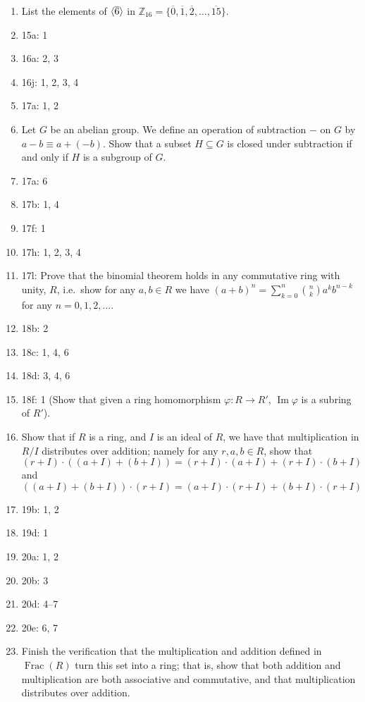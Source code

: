 \documentclass[12pt,letterpaper,DIV=11,final]{scrartcl}
\theoremstyle{plain}
\theoremstyle{definition}
\theoremstyle{remark}
\DeclareMathOperator{\ima}{Im}
\DeclareMathOperator{\Frac}{Frac}
\begin{document}
\begin{enumerate}
  \item List the elements of $\braket{\overline{6}}$ in $\mathbb{Z}_{16} = \{ \overline{0}, \overline{1}, \overline{2}, \dots, \overline{15} \}$.
  \item 15a: 1
  \item 16a: 2, 3
  \item 16j: 1, 2, 3, 4
  \item 17a: 1, 2

  \item Let $G$ be an abelian group.
    We define an operation of subtraction $-$ on $G$ by $a - b \equiv a + (-b)$.
    Show that a subset $H \subseteq G$ is closed under subtraction if and only if $H$ is a subgroup of $G$.
  \item 17a: 6
  \item 17b: 1, 4
  \item 17f: 1
  \item 17h: 1, 2, 3, 4

  \item 17l: Prove that the binomial theorem holds in any commutative ring with unity, $R$,
    i.e.\ show for any $a, b \in R$ we have ${(a + b)}^n = \sum_{k = 0}^n \binom{n}{k} a^k b^{n - k}$ for any $n = 0, 1, 2, \dots$.
  \item 18b: 2
  \item 18c: 1, 4, 6
  \item 18d: 3, 4, 6
  \item 18f: 1 (Show that given a ring homomorphism $\varphi : R \to R'$, $\ima{\varphi}$ is a subring of $R'$).
  \item Show that if $R$ is a ring, and $I$ is an ideal of $R$, we have that multiplication in $R/I$ distributes over addition; namely for any $r, a, b \in R$, show that
    \begin{displaymath}
      (r + I) \cdot \left( (a + I) + (b + I) \right) = (r + I) \cdot (a + I) + (r + I) \cdot (b + I)
    \end{displaymath}
    and
    \begin{displaymath}
      \left( (a + I) + (b + I) \right) \cdot (r + I) = (a + I) \cdot (r + I) + (b + I) \cdot (r + I)
    \end{displaymath}
  \item 19b: 1, 2

  \item 19d: 1
  \item 20a: 1, 2
  \item 20b: 3
  \item 20d: 4--7
  \item 20e: 6, 7
  \item Finish the verification that the multiplication and addition defined in $\Frac(R)$ turn this set into a ring; that is, show that both addition and multiplication are both associative and commutative, and that multiplication distributes over addition.


\end{enumerate}
\end{document}
